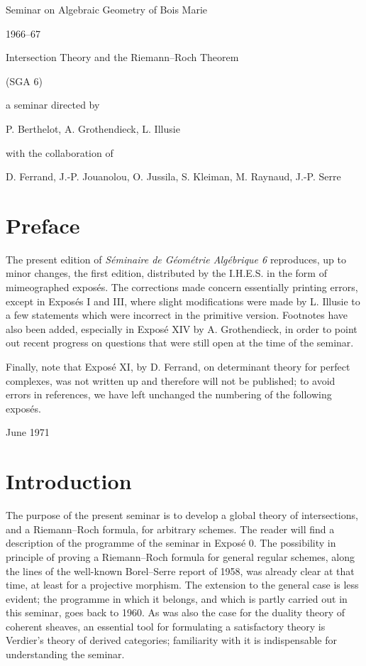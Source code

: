 \begin{center}
{\Large Seminar on Algebraic Geometry of Bois Marie}\par
{\large 1966--67}\par
\vspace{1.5em}
{\Large Intersection Theory and the Riemann--Roch Theorem}\par
{\large (SGA 6)}\par
\vspace{1.5em}
a seminar directed by\par
P. Berthelot, A. Grothendieck, L. Illusie\par
with the collaboration of\par
D. Ferrand, J.-P. Jouanolou, O. Jussila, S. Kleiman, M. Raynaud, J.-P. Serre
\end{center}

\section*{Preface}
The present edition of \emph{Séminaire de Géométrie Algébrique 6} reproduces, up to minor changes, the first edition, distributed by the I.H.E.S. in the form of mimeographed exposés. The corrections made concern essentially printing errors, except in Exposés I and III, where slight modifications were made by L. Illusie to a few statements which were incorrect in the primitive version. Footnotes have also been added, especially in Exposé XIV by A. Grothendieck, in order to point out recent progress on questions that were still open at the time of the seminar.

Finally, note that Exposé XI, by D. Ferrand, on determinant theory for perfect complexes, was not written up and therefore will not be published; to avoid errors in references, we have left unchanged the numbering of the following exposés.

\begin{flushright}June 1971\end{flushright}

\section*{Introduction}
The purpose of the present seminar is to develop a global theory of intersections, and a Riemann--Roch formula, for arbitrary schemes. The reader will find a description of the programme of the seminar in Exposé 0. The possibility in principle of proving a Riemann--Roch formula for general regular schemes, along the lines of the well-known Borel--Serre report of 1958, was already clear at that time, at least for a projective morphism. The extension to the general case is less evident; the programme in which it belongs, and which is partly carried out in this seminar, goes back to 1960. As was also the case for the duality theory of coherent sheaves, an essential tool for formulating a satisfactory theory is Verdier's theory of derived categories; familiarity with it is indispensable for understanding the seminar.

